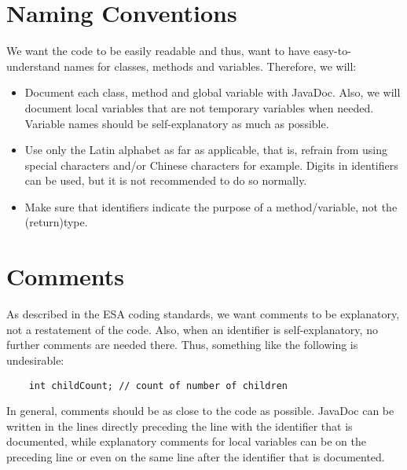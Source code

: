 \section{Naming Conventions}
We want the code to be easily readable and thus, want to have easy-to-understand names for classes, methods and variables. Therefore, we will:

\begin{itemize}
	\item Document each class, method and global variable with JavaDoc. Also, we will document local variables that are not temporary variables when needed. Variable names should be self-explanatory as much as possible.
	\item Use only the Latin alphabet as far as applicable, that is, refrain from using special characters and/or Chinese characters for example. Digits in identifiers can be used, but it is not recommended to do so normally.
	\item Make sure that identifiers indicate the purpose of a method/variable, not the (return)type.
\end{itemize}

\section{Comments}
As described in the ESA coding standards, we want comments to be explanatory, not a restatement of the code. Also, when an identifier is self-explanatory, no further comments are needed there. Thus, something like the following is undesirable:
\begin{center}\begin{verbatim}
	int childCount; // count of number of children
\end{verbatim}\end{center}
In general, comments should be as close to the code as possible. JavaDoc can be written in the lines directly preceding the line with the identifier that is documented, while explanatory comments for local variables can be on the preceding line or even on the same line after the identifier that is documented.